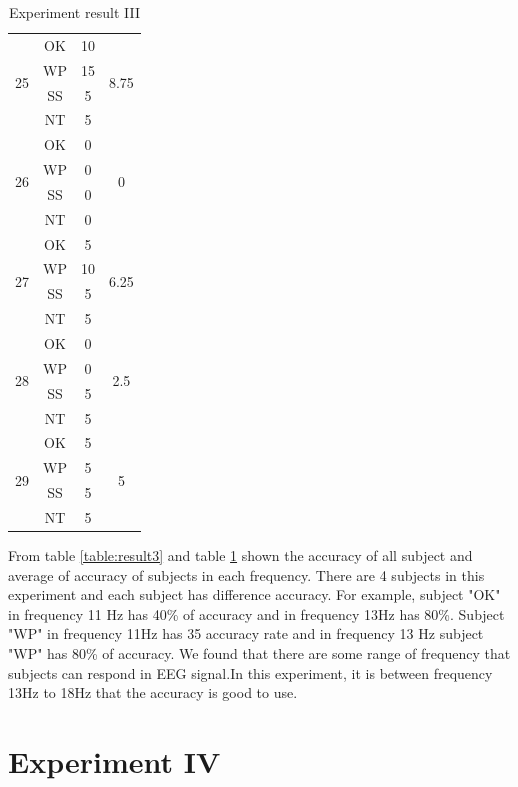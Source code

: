 \begin{table}[ht]
\begin{tabular}{| c | c | c | c |}
            \hline
            \multirow{4}{*}{25}&OK&10&\multirow{4}{*}{8.75} \\
			\cline{2-3}
			&WP&15& \\ \cline{2-3}
			&SS&5& \\ \cline{2-3}
			&NT&5& \\
            \hline
            \multirow{4}{*}{26}&OK&0&\multirow{4}{*}{0} \\
			\cline{2-3}
			&WP&0& \\ \cline{2-3}
			&SS&0& \\ \cline{2-3}
			&NT&0& \\
            \hline
            \multirow{4}{*}{27}&OK&5&\multirow{4}{*}{6.25} \\
			\cline{2-3}
			&WP&10& \\ \cline{2-3}
			&SS&5& \\ \cline{2-3}
			&NT&5& \\
            \hline
            \multirow{4}{*}{28}&OK&0&\multirow{4}{*}{2.5} \\
			\cline{2-3}
			&WP&0& \\ \cline{2-3}
			&SS&5& \\ \cline{2-3}
			&NT&5& \\
            \hline
            \multirow{4}{*}{29}&OK&5&\multirow{4}{*}{5} \\
			\cline{2-3}
			&WP&5& \\ \cline{2-3}
			&SS&5& \\ \cline{2-3}
			&NT&5& \\
            \hline
		\end{tabular}       
\caption{Experiment result III}
\label{table:result3_2}
\end{table}

From table \ref{table:result3} and table \ref{table:result3_2} shown the accuracy of all subject and average of accuracy of subjects in each frequency. There are 4 subjects in this experiment and each subject has difference accuracy. For example, subject "OK" in frequency 11 Hz has 40\% of accuracy and in frequency 13Hz has 80\%. Subject "WP" in frequency 11Hz has 35 accuracy rate and in frequency 13 Hz subject "WP" has 80\% of accuracy. We found that there are some range of frequency that subjects can respond in EEG signal.In this experiment, it is between frequency 13Hz to 18Hz that the accuracy is good to use.

\newpage
\section{Experiment IV}
